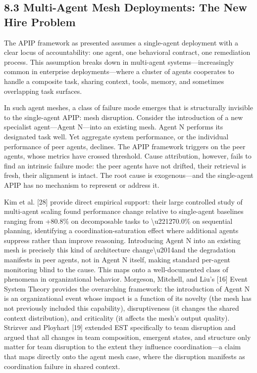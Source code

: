 \subsection{8.3  Multi-Agent Mesh Deployments: The New Hire Problem}

The APIP framework as presented assumes a single-agent deployment with a clear locus of accountability: one agent, one behavioral contract, one remediation process. This assumption breaks down in multi-agent systems---increasingly common in enterprise deployments---where a cluster of agents cooperates to handle a composite task, sharing context, tools, memory, and sometimes overlapping task surfaces.

In such agent meshes, a class of failure mode emerges that is structurally invisible to the single-agent APIP: mesh disruption. Consider the introduction of a new specialist agent---Agent N---into an existing mesh. Agent N performs its designated task well. Yet aggregate system performance, or the individual performance of peer agents, declines. The APIP framework triggers on the peer agents, whose metrics have crossed threshold. Cause attribution, however, fails to find an intrinsic failure mode: the peer agents have not drifted, their retrieval is fresh, their alignment is intact. The root cause is exogenous---and the single-agent APIP has no mechanism to represent or address it.

Kim et al. [28] provide direct empirical support: their large controlled study of multi-agent scaling found performance change relative to single-agent baselines ranging from +80.8\% on decomposable tasks to \textbackslash{}u221270.0\% on sequential planning, identifying a coordination-saturation effect where additional agents suppress rather than improve reasoning. Introducing Agent N into an existing mesh is precisely this kind of architecture change\textbackslash{}u2014and the degradation manifests in peer agents, not in Agent N itself, making standard per-agent monitoring blind to the cause. This maps onto a well-documented class of phenomena in organizational behavior. Morgeson, Mitchell, and Liu's [16] Event System Theory provides the overarching framework: the introduction of Agent N is an organizational event whose impact is a function of its novelty (the mesh has not previously included this capability), disruptiveness (it changes the shared context distribution), and criticality (it affects the mesh's output quality). Strizver and Ployhart [19] extended EST specifically to team disruption and argued that all changes in team composition, emergent states, and structure only matter for team disruption to the extent they influence coordination---a claim that maps directly onto the agent mesh case, where the disruption manifests as coordination failure in shared context.

